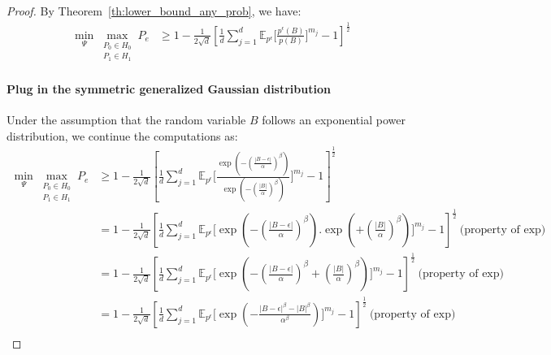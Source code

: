 \begin{proof}
    By Theorem~\ref{th:lower_bound_any_prob}, we have:
\begin{align*}
      \min _{\Psi} 
    \max _{\substack{P_0 \in H_0 \\ P_1 \in H_1}}
        P_e 
        &\geq 1 - \frac{1}{2\sqrt{d}}\left[
             \frac{1}{d}
            \sum_{j=1}^d \mathbb{E}_{p^\epsilon}\Bigg[
           \frac{p^{\epsilon}(B)}{p(B)}\Bigg]^{m_j}
            -1
            \right]^{\frac{1}{2}}
\end{align*}
\paragraph{Plug in the symmetric generalized Gaussian distribution} Under the assumption that the random variable $B$ follows an exponential power distribution, we continue the computations as:
\begin{align*}
    \min _{\Psi} 
    \max _{\substack{P_0 \in H_0 \\ P_1 \in H_1}}
        P_e &\geq 1 - \frac{1}{2\sqrt{d}}\left[
             \frac{1}{d}
            \sum_{j=1}^d \mathbb{E}_{p^\epsilon}\Bigg[
            \frac{ \exp\left(-\left(\frac{|B - \epsilon|}{\alpha}\right)^\beta\right)}{ \exp\left(-\left(\frac{|B|}{\alpha}\right)^\beta\right)}\Bigg]^{m_j}
            -1
            \right]^{\frac{1}{2}}\\
        &= 1 - \frac{1}{2\sqrt{d}}\left[
             \frac{1}{d}
            \sum_{j=1}^d \mathbb{E}_{p^\epsilon}\Bigg[
            \exp\left(-\left(\frac{|B - \epsilon|}{\alpha}\right)^\beta\right)
            . \exp\left(+\left(\frac{|B|}{\alpha}\right)^\beta\right)\Bigg]^{m_j}
            -1
            \right]^{\frac{1}{2}}~\text{(property of exp)}\\
        &= 1 - \frac{1}{2\sqrt{d}}\left[
             \frac{1}{d}
            \sum_{j=1}^d \mathbb{E}_{p^\epsilon}\Bigg[
            \exp\left(-\left(\frac{|B - \epsilon|}{\alpha}\right)^\beta
            +
            \left(\frac{|B|}{\alpha}\right)^\beta\right)\Bigg]^{m_j}
            -1
            \right]^{\frac{1}{2}}~\text{(property of exp)}\\
        &= 1 - \frac{1}{2\sqrt{d}}\left[
             \frac{1}{d}
            \sum_{j=1}^d \mathbb{E}_{p^\epsilon}\Bigg[
            \exp\left(-
            \frac{|B - \epsilon|^\beta-|B|^\beta}{\alpha^\beta}
            \right)\Bigg]^{m_j}
            -1
            \right]^{\frac{1}{2}}~\text{(property of exp)}\\
\end{align*}
\end{proof}

